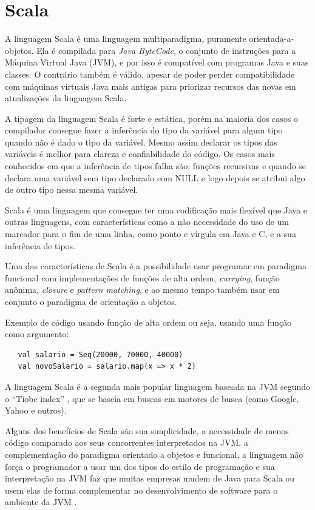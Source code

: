 \documentclass[rel-mlp]{iiufrgs}
\begin{document}
\chapter{Scala}

A linguagem Scala é uma linguagem multiparadigma, puramente orientada-a-objetos. Ela é compilada para \textit{Java ByteCode}, o conjunto de instruções para a Máquina Virtual Java (JVM), e por isso é compatível com programas Java e suas classes. O contrário também é válido, apesar de poder perder compatibilidade com máquinas virtuais Java mais antigas para priorizar recursos das novas em atualizações da linguagem Scala.

A tipagem da linguagem Scala é forte e estática, porém na maioria dos casos o compilador consegue fazer a inferência do tipo da variável para algum tipo quando não é dado o tipo da variável. Mesmo assim declarar os tipos das variáveis é melhor para clareza e confiabilidade do código. Os casos mais conhecidos em que a inferência de tipos falha são: funções recursivas e quando se declara uma variável sem tipo declarado com NULL e logo depois se atribui algo de outro tipo nessa mesma variável.

Scala é uma linguagem que consegue ter uma codificação mais flexível que Java e outras linguagens, com características como a não necessidade do uso de um marcador para o fim de uma linha, como ponto e vírgula em Java e C, e a sua inferência de tipos.
 
Uma das características de Scala é a possibilidade usar programar em paradigma funcional com implementações de funções de alta ordem, \textit{currying}, função anônima, \textit{closure} e \textit{pattern matching}, e ao mesmo tempo também usar em conjunto o paradigma de orientação a objetos.
 
  Exemplo de código usando função de alta ordem ou seja, usando uma função como argumento:
  
  \begin{lstlisting}
   val salario = Seq(20000, 70000, 40000)
   val novoSalario = salario.map(x => x * 2)
 \end{lstlisting}
 
A linguagem Scala é a segunda mais popular linguagem baseada na JVM segundo o ``Tiobe index'' \cite{tiobe}, que se baseia em buscas em motores de busca (como Google, Yahoo e outros).
 
Alguns dos benefícios de Scala são sua simplicidade, a necessidade de menos código comparado aos seus concorrentes interpretados na JVM, a complementação do paradigma orientado a objetos e funcional, a linguagem não força o programador a usar um dos tipos do estilo de programação e sua interpretação na JVM faz que muitas empresas mudem de Java para Scala ou usem elas de forma complementar no desenvolvimento de software para o ambiente da JVM \cite{wiki_scala}.
\end{document}
